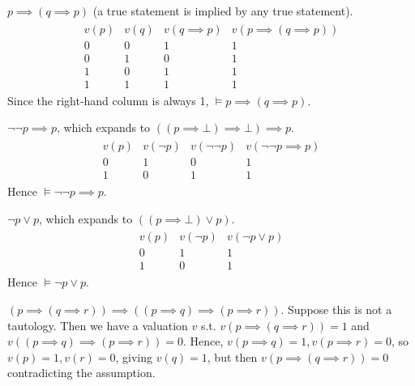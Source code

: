 \begin{example}
    $p \implies (q \implies p)$ (a true statement is implied by any true statement).
    \begin{align*}
\begin{array}{cccc}
        v(p) & v(q) & v(q \implies p) & v(p \implies (q \implies p)) \\
        0 & 0 & 1 & 1 \\
        0 & 1 & 0 & 1 \\
        1 & 0 & 1 & 1 \\
        1 & 1 & 1 & 1
    \end{array}
\end{align*}
    Since the right-hand column is always 1, $\models p \implies (q \implies p)$.
\end{example}

\begin{example}
    $\neg \neg p \implies p$, which expands to $((p \implies \bot) \implies \bot) \implies p$.
    \begin{align*}
\begin{array}{cccc}
        v(p) & v(\neg p) & v(\neg \neg p) & v(\neg \neg p \implies p) \\
        0 & 1 & 0 & 1 \\
        1 & 0 & 1 & 1
    \end{array}
\end{align*}
    Hence $\models \neg \neg p \implies p$.
\end{example}

\begin{example}
    $\neg p \vee p$, which expands to $((p \implies \bot) \vee p)$.
    \begin{align*}
\begin{array}{cccc}
        v(p) & v(\neg p) & v(\neg p \vee p) \\
        0 & 1 & 1 \\
        1 & 0 & 1
    \end{array}
\end{align*}
    Hence $\models \neg p \vee p$.
\end{example}

\begin{example}
    $(p \implies (q \implies r)) \implies ((p \implies q) \implies (p \implies r))$.
    Suppose this is not a tautology.
    Then we have a valuation $v$ s.t. $v(p \implies (q \implies r)) = 1$ and $v((p \implies q) \implies (p \implies r)) = 0$.
    Hence, $v(p \implies q) = 1, v(p \implies r) = 0$, so $v(p) = 1, v(r) = 0$, giving $v(q) = 1$, but then $v(p \implies (q \implies r)) = 0$ contradicting the assumption.
\end{example}

